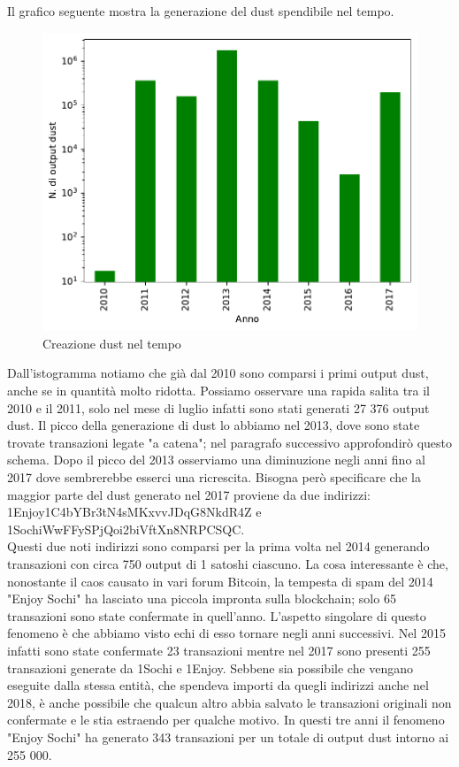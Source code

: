 Il grafico seguente mostra la generazione del dust spendibile nel tempo.
\begin{figure}[h!]
    \centering
    \includegraphics[scale=0.9]{Grafici/dust_created_year.pdf}
    \caption{Creazione dust nel tempo}
    \label{fig:dust_created}
\end{figure}
\FloatBarrier 
Dall'istogramma notiamo che già dal 2010 sono comparsi i primi output dust, anche se in quantità molto ridotta. Possiamo osservare una rapida salita tra il 2010 e il 2011, solo nel mese di luglio infatti sono stati generati 27 376 output dust.
Il picco della generazione di dust lo abbiamo nel 2013, dove sono state trovate transazioni legate "a catena"; nel paragrafo successivo approfondirò questo schema. Dopo il picco del 2013 osserviamo una diminuzione negli anni fino al 2017 dove sembrerebbe esserci una ricrescita. Bisogna però specificare che la maggior parte del dust generato nel 2017 proviene da due indirizzi: 1Enjoy1C4bYBr3tN4sMKxvvJDqG8NkdR4Z e 1SochiWwFFySPjQoi2biVftXn8NRPCSQC.\\Questi due noti indirizzi sono comparsi per la prima volta nel 2014 generando transazioni con circa 750 output di 1 satoshi ciascuno. La cosa interessante è che, nonostante il caos causato in vari forum Bitcoin, la tempesta di spam del 2014 "Enjoy Sochi" ha lasciato una piccola impronta sulla blockchain; solo 65 transazioni sono state confermate in quell'anno. L'aspetto singolare di questo fenomeno è che abbiamo visto echi di esso tornare negli anni successivi. Nel 2015 infatti sono state confermate 23 transazioni mentre nel 2017 sono presenti 255 transazioni generate da 1Sochi e 1Enjoy. Sebbene sia possibile che vengano eseguite dalla stessa entità, che spendeva importi da quegli indirizzi anche nel 2018, è anche possibile che qualcun altro abbia salvato le transazioni originali non confermate e le stia estraendo per qualche motivo. In questi tre anni il fenomeno "Enjoy Sochi" ha generato 343 transazioni per un totale di output dust intorno ai 255 000.\\\\
